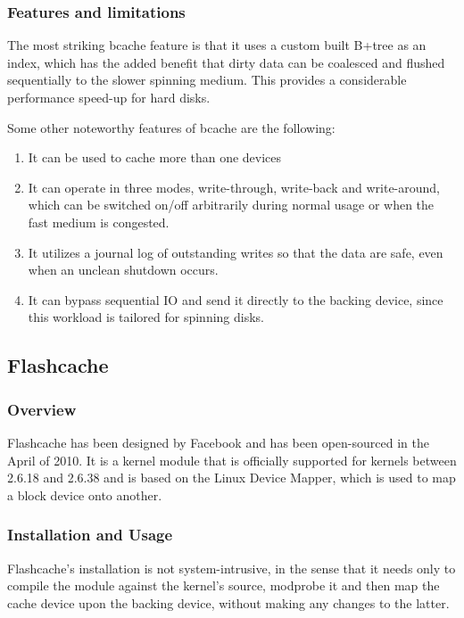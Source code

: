 \subsubsection{Features and limitations}

The most striking bcache feature is that it uses a custom built B+tree as an 
index, which has the added benefit that dirty data can be coalesced and flushed 
sequentially to the slower spinning medium. This provides a considerable 
performance speed-up for hard disks.

Some other noteworthy features of bcache are the following:

\begin{enumerate}
	\item It can be used to cache more than one devices
	\item It can operate in three modes, write-through, write-back and 
		write-around, which can be switched on/off arbitrarily during normal 
		usage or when the fast medium is congested.
	\item It utilizes a journal log of outstanding writes so that the data are 
		safe, even when an unclean shutdown occurs.
	\item It can bypass sequential IO and send it directly to the backing 
		device, since this workload is tailored for spinning disks.
\end{enumerate}

\subsection{Flashcache}

\subsubsection{Overview}

Flashcache has been designed by Facebook and has been open-sourced in the April 
of 2010. It is a kernel module that is officially supported for kernels between  
2.6.18 and 2.6.38 and is based on the Linux Device Mapper, which is used to map 
a block device onto another.

\subsubsection{Installation and Usage}

Flashcache's installation is not system-intrusive, in the sense that it needs 
only to compile the module against the kernel's source, modprobe it and then 
map the cache device upon the backing device, without making any changes to the 
latter.

